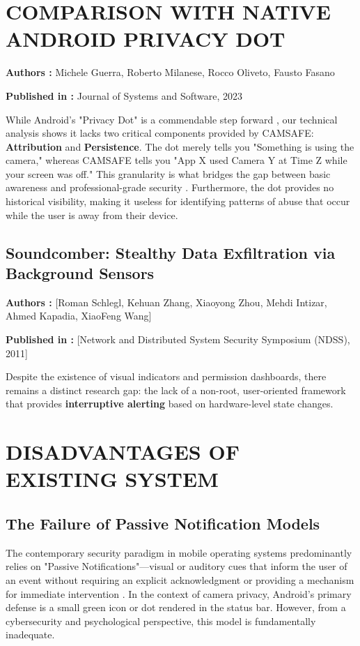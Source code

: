\documentclass[12pt,a4paper]{report}
\begin{document}
\begin{enumerate}
    \section{COMPARISON WITH NATIVE ANDROID PRIVACY DOT}

    \textbf{Authors :} Michele Guerra, Roberto Milanese, Rocco Oliveto, Fausto Fasano

    \textbf{Published in :} Journal of Systems and Software, 2023

    While Android's "Privacy Dot" is a commendable step forward \cite{privacydot}, our technical analysis shows it lacks two critical components provided by CAMSAFE: \textbf{Attribution} and \textbf{Persistence}. The dot merely tells you "Something is using the camera," whereas CAMSAFE tells you "App X used Camera Y at Time Z while your screen was off." This granularity is what bridges the gap between basic awareness and professional-grade security \cite{privacydot}. Furthermore, the dot provides no historical visibility, making it useless for identifying patterns of abuse that occur while the user is away from their device.

    \subsection{Soundcomber: Stealthy Data Exfiltration via Background Sensors}

    \textbf{Authors :} [Roman Schlegl, Kehuan Zhang, Xiaoyong Zhou, Mehdi Intizar, Ahmed Kapadia, XiaoFeng Wang]

    \textbf{Published in :} [Network and Distributed System Security Symposium (NDSS), 2011]

    Despite the existence of visual indicators and permission dashboards, there remains a distinct research gap: the lack of a non-root, user-oriented framework that provides \textbf{interruptive alerting} based on hardware-level state changes. 
    \clearpage



    \section{DISADVANTAGES OF EXISTING SYSTEM}
    \subsection{The Failure of Passive Notification Models}
    The contemporary security paradigm in mobile operating systems predominantly relies on "Passive Notifications"—visual or auditory cues that inform the user of an event without requiring an explicit acknowledgment or providing a mechanism for immediate intervention \cite{privacydot}. In the context of camera privacy, Android's primary defense is a small green icon or dot rendered in the status bar. However, from a cybersecurity and psychological perspective, this model is fundamentally inadequate.


\end{enumerate}
\end{document}
